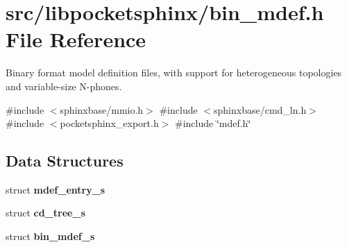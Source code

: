 \section{src/libpocketsphinx/bin\+\_\+mdef.h File Reference}
\label{bin__mdef_8h}


Binary format model definition files, with support for heterogeneous topologies and variable-\/size N-\/phones.  


{\ttfamily \#include $<$sphinxbase/mmio.\+h$>$}\newline
{\ttfamily \#include $<$sphinxbase/cmd\+\_\+ln.\+h$>$}\newline
{\ttfamily \#include $<$pocketsphinx\+\_\+export.\+h$>$}\newline
{\ttfamily \#include \char`\"{}mdef.\+h\char`\"{}}\newline
\subsection*{Data Structures}
\begin{DoxyCompactItemize}
\item 
struct \textbf{ mdef\+\_\+entry\+\_\+s}
\item 
struct \textbf{ cd\+\_\+tree\+\_\+s}
\item 
struct \textbf{ bin\+\_\+mdef\+\_\+s}
\end{DoxyCompactItemize}
